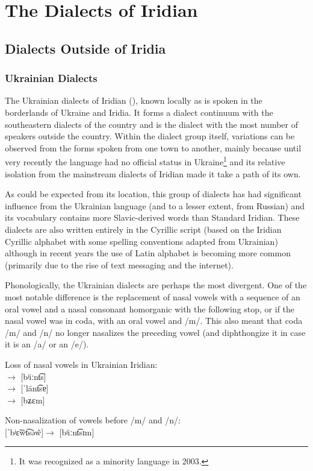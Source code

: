 \chapter{The Dialects of Iridian}


\section{Dialects Outside of Iridia}

\subsection{Ukrainian Dialects}

The Ukrainian dialects of Iridian (), known locally as  is spoken in the borderlands of Ukraine and Iridia. It forms a dialect continuum with the southeastern dialects of the country and is the dialect with the most number of speakers outside the country. Within the dialect group itself, variations can be observed from the forms spoken from one town to another, mainly because until very recently the language had no official status in Ukraine\footnote{It was recognized as a minority language in 2003.} and its relative isolation from the mainstream dialects of Iridian made it take a path of its own.

As could be expected from its location, this group of dialects has had significant influence from the Ukrainian language (and to a lesser extent, from Russian) and its vocabulary contains more Slavic-derived words than Standard Iridian. These dialects are also written entirely in the Cyrillic script (based on the Iridian Cyrillic alphabet with some spelling conventions adapted from Ukrainian) although in recent years the use of Latin alphabet is becoming more common (primarily due to the rise of text messaging and the internet).

Phonologically, the Ukrainian dialects are perhaps the most divergent. One of the most notable difference is the replacement of nasal vowels with a sequence of an oral vowel and a nasal consonant homorganic with the following stop, or if the nasal vowel was in coda, with an oral vowel and /m/. This also meant that coda /m/ and /n/ no longer nasalizes the preceding vowel (and diphthongize it in case it is an /a/ or an /e/).

\ex
Loss of nasal vowels in Ukrainian Iridian:\\
\quad$\rightarrow$\quad{} [bʲiːnt͡s]\\
\quad$\rightarrow$\quad{} [ˈlänt͡sɐ]\\
\quad$\rightarrow$\quad{} [bʑɛm]
\xe

\ex
Non-nasalization of vowels before /m/ and /n/:\\
[ˈbʲɛ̃w̃t͡sə̃w̃]\quad$\rightarrow$\quad{} [bʲiːnt͡sɪm]\\

\xe
